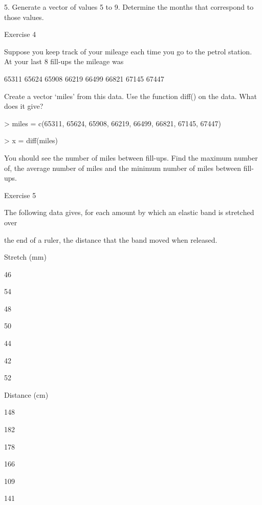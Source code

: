 5.
Generate a vector of values 5 to 9.  Determine the months that correspond to those values.


 

Exercise 4

 

Suppose you keep track of your mileage each time you go to the petrol station. At your last 8 fill-ups the mileage was

 

65311 65624 65908 66219 66499 66821 67145 67447

 

 Create a vector ‘miles’ from this data. Use the function diff() on the data. What does it give?

 

> miles = c(65311, 65624, 65908, 66219, 66499, 66821, 67145, 67447)

> x = diff(miles)

 

You should see the number of miles between fill-ups. Find the maximum number of, the average number of miles and the minimum number of miles between fill-ups.

 

Exercise 5

 

The following data gives, for each amount by which an elastic band is stretched over

the end of a ruler, the distance that the band moved when released.

 














Stretch (mm)
 

46
 

54
 

48
 

50
 

44
 

42
 

52
 



Distance (cm)
 

148
 

182
 

178
 

166
 

109
 

141
 


